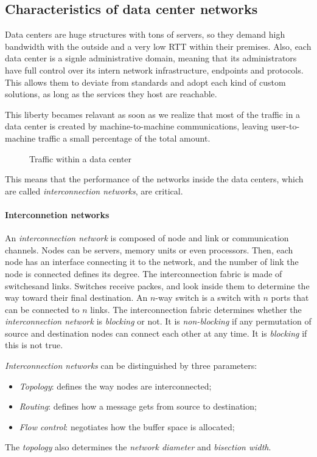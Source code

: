 \subsection{Characteristics of data center networks}
Data centers are huge structures with tons of servers, so they demand high
bandwidth with the outside and a very low RTT within their premises. Also,
each data center is a signle administrative domain, meaning that its
administrators have full control over its intern network infrastructure, 
endpoints and protocols. This allows them to deviate from standards and adopt
each kind of custom solutions, as long as the services they host are reachable.

This liberty becames relavant as soon as we realize that most of the traffic
in a data center is created by machine-to-machine communications, leaving
user-to-machine traffic a small percentage of the total amount. 

\begin{figure}[h!]
    \centering
    \caption{Traffic within a data center}
\end{figure}

\noindent
This means that the performance of the networks inside the data centers, which
are called \emph{interconnection networks}, are critical.

\paragraph{Interconnetion networks}
An \emph{interconnection network} is composed of node and link or communication
channels. Nodes can be servers, memory units or even processors. Then, each node
has an interface connecting it to the network, and the number of link the node
is connected defines its degree. The interconnection fabric is made of
switches\footnotemark and links. Switches receive packes, and look inside them
to determine the way toward their final destination. An $n$-way switch is a
switch with $n$ ports that can be connected to $n$ links. The interconnection
fabric determines whether the \emph{interconnection network} is \emph{blocking}
or not. It is \emph{non-blocking} if any permutation of source and destination
nodes can connect each other at any time. It is \emph{blocking} if this is not
true.


\emph{Interconnection networks} can be distinguished by three parameters:
\begin{itemize}
    \item \emph{Topology}: defines the way nodes are interconnected;
    \item \emph{Routing}: defines how a message gets from source to destination;
    \item \emph{Flow control}: negotiates how the buffer space is allocated;
\end{itemize}
The \emph{topology} also determines the \emph{network diameter} and
\emph{bisection width}.

